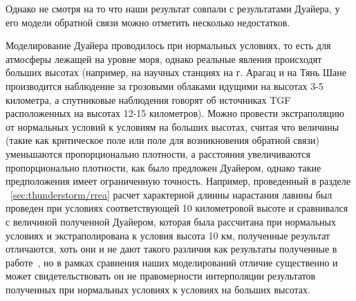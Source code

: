 Однако не смотря на то что наши результат совпали с результатами Дуайера, у его модели обратной связи можно отметить несколько недостатков. 

Моделирование Дуайера проводилось при нормальных условиях, то есть для атмосферы лежащей на уровне моря, однако реальные явления происходят больших высотах (например, на научных станциях на г. Арагац и на Тянь Шане производится наблюдение за грозовыми облаками идущими на высотах 3-5 километра, а спутниковые наблюдения говорят об источниках TGF расположенных на высотах 12-15 километров). Можно провести экстраполяцию от нормальных условий к условиям на больших высотах, считая что величины (такие как критическое  поле или поле для возникновения обратной связи) уменьшаются пропорционально плотности, а расстояния увеличиваются пропорционально плотности, как было предложен Дуайером, однако такие предположения имеет ограниченную точность. Например, проведенный в разделе ~\ref{sec:thunderstorm/rrea} расчет характерной длинны нарастания лавины был проведен при условиях соответствующей 10 километровой высоте и сравнивался с величиной полученной Дуайером, которая была рассчитана при нормальных условиях и экстраполирована к условия высота 10 км, полученные результат отличаются, хоть они и не дают такого различия как результаты полученные в работе~\cite{Oreshkin_2018}, но в рамках сравнения наших моделирований отличие существенно и может свидетельствовать он не правомерности интерполяции результатов полученных при нормальных условиях к условиях на больших высотах. 

